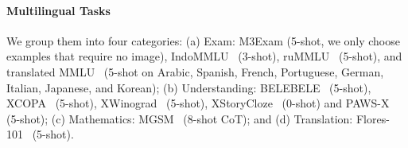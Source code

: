 \documentclass{article}
\begin{document}
\paragraph{Multilingual Tasks} We group them into four categories: (a) Exam: M3Exam (5-shot, we only choose examples that require no image), IndoMMLU~\citep{koto-etal-2023-indommlu} (3-shot), ruMMLU~\citep{rummlu-mera} (5-shot), and translated MMLU~\citep{msift} (5-shot on Arabic, Spanish, French, Portuguese, German, Italian, Japanese, and Korean); (b) Understanding: BELEBELE~\citep{belebele} (5-shot), XCOPA~\citep{xcopa} (5-shot), XWinograd~\citep{xwinograd} (5-shot), XStoryCloze~\citep{xstory_cloze} (0-shot) and PAWS-X~\citep{paws-x} (5-shot); (c) Mathematics: MGSM~\citep{flores} (8-shot CoT); and (d) Translation: Flores-101~\citep{flores} (5-shot).

\begin{table}[tbp]
\centering
\caption{\textbf{Performance of the 70B+ base models and Qwen2.5-Plus.}}
\label{tab:base-70B}
\small 
\setlength{\tabcolsep}{3pt} 
\renewcommand{\arraystretch}{0.9} 


\end{table}
\end{document}
